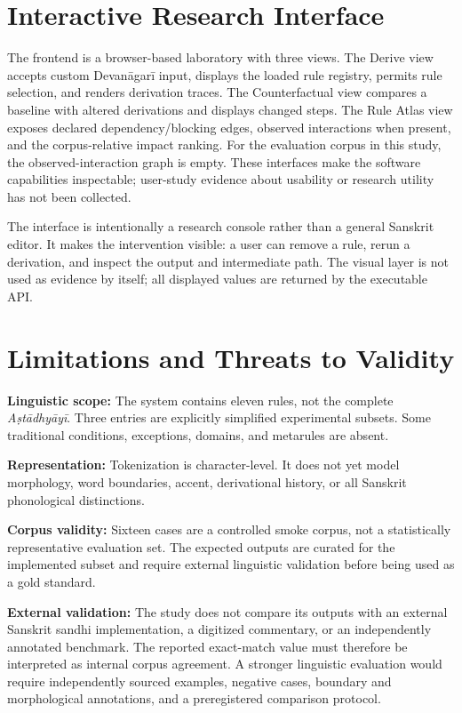 \documentclass[conference]{IEEEtran}
\begin{document}
\section{Interactive Research Interface}
The frontend is a browser-based laboratory with three views. The Derive view accepts custom Devan\=agar\=i input, displays the loaded rule registry, permits rule selection, and renders derivation traces. The Counterfactual view compares a baseline with altered derivations and displays changed steps. The Rule Atlas view exposes declared dependency/blocking edges, observed interactions when present, and the corpus-relative impact ranking. For the evaluation corpus in this study, the observed-interaction graph is empty. These interfaces make the software capabilities inspectable; user-study evidence about usability or research utility has not been collected.

The interface is intentionally a research console rather than a general Sanskrit editor. It makes the intervention visible: a user can remove a rule, rerun a derivation, and inspect the output and intermediate path. The visual layer is not used as evidence by itself; all displayed values are returned by the executable API.

\section{Limitations and Threats to Validity}
\label{sec:limitations}
\textbf{Linguistic scope:} The system contains eleven rules, not the complete \textit{A\d{s}t\=adhy\=ay\=i}. Three entries are explicitly simplified experimental subsets. Some traditional conditions, exceptions, domains, and metarules are absent.

\textbf{Representation:} Tokenization is character-level. It does not yet model morphology, word boundaries, accent, derivational history, or all Sanskrit phonological distinctions.

\textbf{Corpus validity:} Sixteen cases are a controlled smoke corpus, not a statistically representative evaluation set. The expected outputs are curated for the implemented subset and require external linguistic validation before being used as a gold standard.

\textbf{External validation:} The study does not compare its outputs with an external Sanskrit sandhi implementation, a digitized commentary, or an independently annotated benchmark. The reported exact-match value must therefore be interpreted as internal corpus agreement. A stronger linguistic evaluation would require independently sourced examples, negative cases, boundary and morphological annotations, and a preregistered comparison protocol.
\end{document}
